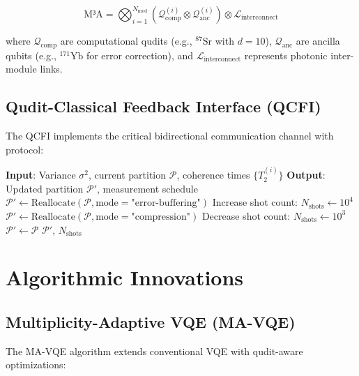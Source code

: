 \documentclass[12pt, a4paper]{article}
\begin{document}
\begin{equation}
\text{M³A} = \bigotimes_{i=1}^{N_{\text{mod}}} \left( \mathcal{Q}^{(i)}_{\text{comp}} \otimes \mathcal{Q}^{(i)}_{\text{anc}} \right) \otimes \mathcal{L}_{\text{interconnect}}
\end{equation}

where $\mathcal{Q}_{\text{comp}}$ are computational qudits (e.g., $^{87}\text{Sr}$ with $d=10$), $\mathcal{Q}_{\text{anc}}$ are ancilla qubits (e.g., $^{171}\text{Yb}$ for error correction), and $\mathcal{L}_{\text{interconnect}}$ represents photonic inter-module links.

\subsection{Qudit-Classical Feedback Interface (QCFI)}
The QCFI implements the critical bidirectional communication channel with protocol:

\begin{algorithm}[H]
\caption{QCFI Adaptive Subspace Allocation}
\label{alg:qcfi}
\begin{algorithmic}[1]
\State \textbf{Input}: Variance $\sigma^2$, current partition $\mathcal{P}$, coherence times $\{T_2^{(i)}\}$
\State \textbf{Output}: Updated partition $\mathcal{P}'$, measurement schedule
    \State $\mathcal{P}' \gets \text{Reallocate}(\mathcal{P}, \text{mode}=\text{"error-buffering"})$
    \State Increase shot count: $N_{\text{shots}} \gets 10^4$
    \State $\mathcal{P}' \gets \text{Reallocate}(\mathcal{P}, \text{mode}=\text{"compression"})$
    \State Decrease shot count: $N_{\text{shots}} \gets 10^3$
\Else
    \State $\mathcal{P}' \gets \mathcal{P}$ 
\EndIf
\State \Return $\mathcal{P}'$, $N_{\text{shots}}$
\end{algorithmic}
\end{algorithm}

\section{Algorithmic Innovations}
\label{sec:algorithms}

\subsection{Multiplicity-Adaptive VQE (MA-VQE)}
The MA-VQE algorithm extends conventional VQE with qudit-aware optimizations:
\end{document}
